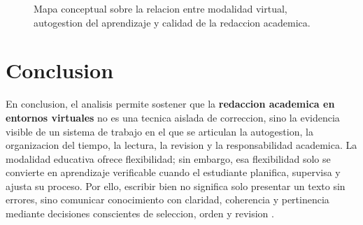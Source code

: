 \documentclass[
	spanish,
	letterpaper, oneside
]{article}
\begin{document}
\begin{landscape}
\begin{figure}[p]
{
}%
\caption{Mapa conceptual sobre la relacion entre modalidad virtual, autogestion del aprendizaje y calidad de la redaccion academica.}
\label{fig:mapa-conceptual-redaccion}
\end{figure}
\end{landscape}
\endgroup
\clearpage

\section{Conclusion}

En conclusion, el analisis permite sostener que la \textbf{redaccion academica en entornos virtuales} no es una tecnica aislada de correccion, sino la evidencia visible de un sistema de trabajo en el que se articulan la autogestion, la organizacion del tiempo, la lectura, la revision y la responsabilidad academica. La modalidad educativa ofrece flexibilidad; sin embargo, esa flexibilidad solo se convierte en aprendizaje verificable cuando el estudiante planifica, supervisa y ajusta su proceso. Por ello, escribir bien no significa solo presentar un texto sin errores, sino comunicar conocimiento con claridad, coherencia y pertinencia mediante decisiones conscientes de seleccion, orden y revision \citep{vitoriaEscrituraAcademicaFormacion2019,correaManualBasicoEscritura2018,nunezcortesEscrituraAcademicaTeoria2015}.
\end{document}
